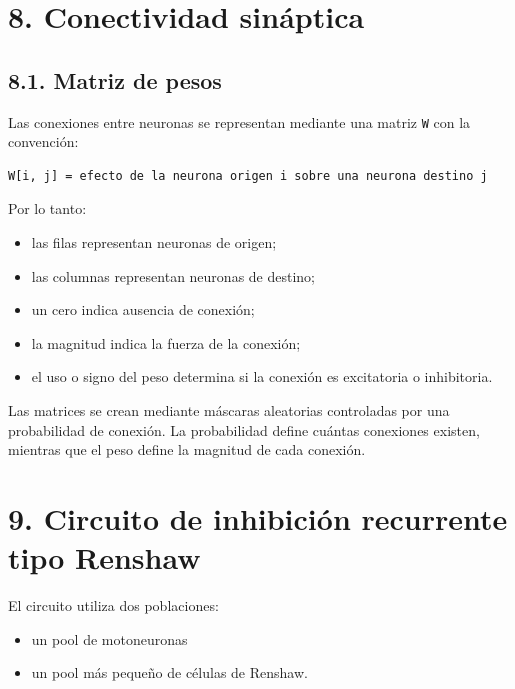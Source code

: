 \documentclass[11pt,a4paper]{article}
\providecommand{\tightlist}{%
  \setlength{\itemsep}{0pt}\setlength{\parskip}{0pt}}
\begin{document}
\hypertarget{conectividad-sinuxe1ptica}{%
\section{8. Conectividad sináptica}\label{conectividad-sinuxe1ptica}}

\hypertarget{matriz-de-pesos}{%
\subsection{8.1. Matriz de pesos}\label{matriz-de-pesos}}

Las conexiones entre neuronas se representan mediante una matriz
\texttt{W} con la convención:

\begin{lstlisting}
W[i, j] = efecto de la neurona origen i sobre una neurona destino j
\end{lstlisting}

Por lo tanto:

\begin{itemize}
\tightlist
\item
  las filas representan neuronas de origen;
\item
  las columnas representan neuronas de destino;
\item
  un cero indica ausencia de conexión;
\item
  la magnitud indica la fuerza de la conexión;
\item
  el uso o signo del peso determina si la conexión es excitatoria o
  inhibitoria.
\end{itemize}

Las matrices se crean mediante máscaras aleatorias controladas por una
probabilidad de conexión. La probabilidad define cuántas conexiones
existen, mientras que el peso define la magnitud de cada conexión.

\hypertarget{circuito-de-inhibiciuxf3n-recurrente-tipo-renshaw}{%
\section{9. Circuito de inhibición recurrente tipo
Renshaw}\label{circuito-de-inhibiciuxf3n-recurrente-tipo-renshaw}}

El circuito utiliza dos poblaciones:

\begin{itemize}
\tightlist
\item
  un pool de motoneuronas
\item
  un pool más pequeño de células de Renshaw.
\end{itemize}
\end{document}
